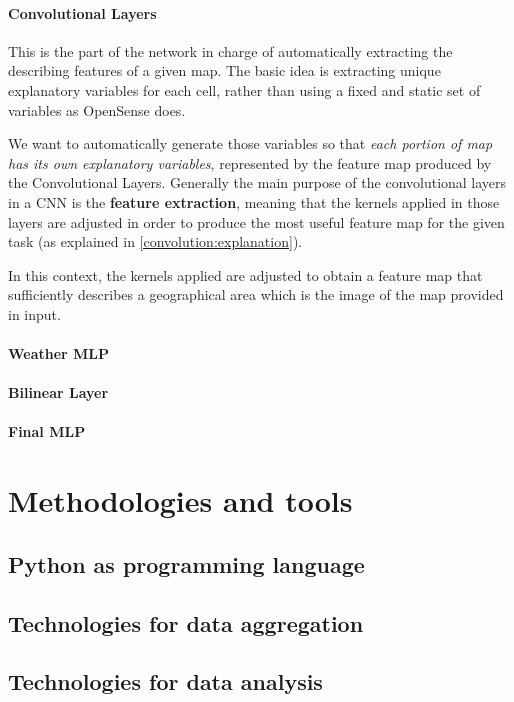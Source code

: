\documentclass[11pt,a4paper,titlepage]{book}
\begin{document}
\subsubsection{Convolutional Layers}
This is the part of the network in charge of automatically extracting the describing features of a given map. The basic idea is extracting unique explanatory variables for each cell, rather than using a fixed and static set of variables as OpenSense does.

We want to automatically generate those variables so that \textit{each portion of map has its own explanatory variables}, represented by the feature map produced by the Convolutional Layers.
\newline
\newline
Generally the main purpose of the convolutional layers in a CNN is the \textbf{feature extraction}, meaning that the kernels applied in those layers are adjusted in order to produce the most useful feature map for the given task (as explained in \ref{convolution:explanation}). 

In this context, the kernels applied are adjusted to obtain a feature map that sufficiently describes a geographical area which is the image of the map provided in input.
\subsubsection{Weather MLP}
\subsubsection{Bilinear Layer}
\subsubsection{Final MLP}

\chapter{Methodologies and tools}
\section{Python as programming language}
\section{Technologies for data aggregation}
\section{Technologies for data analysis}
\end{document}
